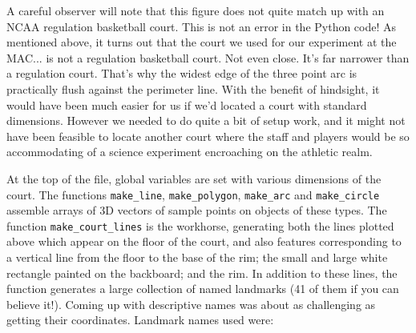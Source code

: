 \documentclass{article}
\begin{document}
A careful observer will note that this figure does not quite match up with an NCAA regulation basketball court.
This is not an error in the Python code!  
As mentioned above, it turns out that the court we used for our experiment at the MAC...
is not a regulation basketball court.  Not even close.  It's far narrower than a regulation court.
That's why the widest edge of the three point arc is practically flush against the perimeter line.
With the benefit of hindsight, it would have been much easier for us if we'd located a court with standard dimensions.
However we needed to do quite a bit of setup work, and it might not have been feasible to locate another court
where the staff and players would be so accommodating of a science experiment encroaching on the athletic realm.

At the top of the file, global variables are set with various dimensions of the court.
The functions \texttt{make\_line}, \texttt{make\_polygon}, \texttt{make\_arc}  and \texttt{make\_circle}
assemble arrays of 3D vectors of sample points on objects of these types.
The function \texttt{make\_court\_lines} is the workhorse, generating both the lines plotted above
which appear on the floor of the court, and also features corresponding to a vertical line from the
floor to the base of the rim; the small and large white rectangle painted on the backboard;
and the rim.  In addition to these lines, the function generates a large collection of named landmarks 
(41 of them if you can believe it!).  
Coming up with descriptive names was about as challenging as getting their coordinates.
Landmark names used were:
\end{document}
